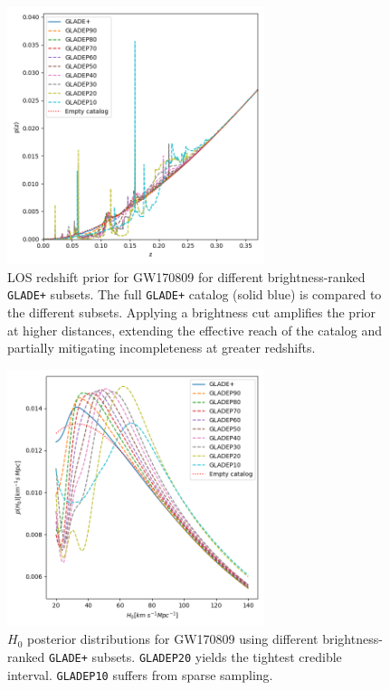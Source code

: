 \begin{figure}[ht]
  \centering
  \includegraphics[width=0.67\textwidth]{figures/GW170809_zprior.png}
  \caption[LOS redshift prior for GW170809 for different brightness-ranked \texttt{GLADE+} subsets]{LOS redshift prior for GW170809 for different brightness-ranked \texttt{GLADE+} subsets. The full \texttt{GLADE+} catalog (solid blue) is compared to the different subsets. Applying a brightness cut amplifies the prior at higher distances, extending the effective reach of the catalog and partially mitigating incompleteness at greater redshifts.}
  \label{fig:los_prior_gw170809}
\end{figure}

\begin{figure}[h!]
  \centering
  \includegraphics[width=0.67\textwidth]{figures/GW170809_H0.png}
  \caption[$H_0$ posterior distributions for GW170809 using different brightness-ranked \texttt{GLADE+} subsets.]{$H_0$ posterior distributions for GW170809 using different brightness-ranked \texttt{GLADE+} subsets. \texttt{GLADEP20} yields the tightest credible interval. \texttt{GLADEP10} suffers from sparse sampling.}
  \label{fig:h0_gw170809}
\end{figure}

